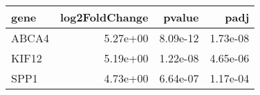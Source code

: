 \begin{tabular}{lrrr}
\toprule
 gene &  log2FoldChange &   pvalue &     padj \\
\midrule
ABCA4 &        5.27e+00 & 8.09e-12 & 1.73e-08 \\
KIF12 &        5.19e+00 & 1.22e-08 & 4.65e-06 \\
 SPP1 &        4.73e+00 & 6.64e-07 & 1.17e-04 \\
\bottomrule
\end{tabular}
